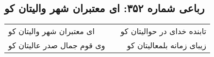 \begin{center}
\section*{رباعی شماره ۳۵۲: ای معتبران شهر والیتان کو}
\label{sec:sh352}
\begin{longtable}{l p{0.5cm} r}
ای معتبران شهر والیتان کو
&&
تابنده خدای در حوالیتان کو
\\
وی قوم جمال صدر عالیتان کو
&&
زیبای زمانه بلمعالیتان کو
\\
\end{longtable}
\end{center}
